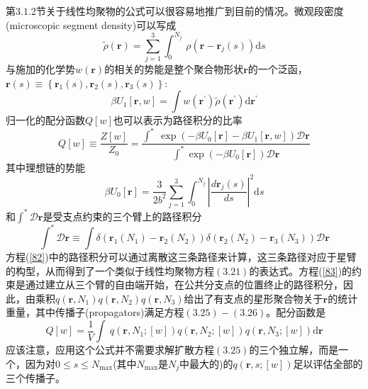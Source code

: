 第$3.1.2$节关于线性均聚物的公式可以很容易地推广到目前的情况。微观段密度(microscopic segment density)可以写成
\begin{equation}
\tilde{\rho}(\mathbf{r})=\sum_{j=1}^3 \int_{0}^{N_j}\,\rho(\mathbf{r}-\mathbf{r}_{j}(s)) \mathrm{d}s
\end{equation}
与施加的化学势$w (\mathbf{r})$的相关的势能是整个聚合物形状$\mathbf{r}$的一个泛函，$\mathbf{r}(s)\equiv \left\{ \mathbf{r}_1(s),\mathbf{r}_2(s),\mathbf{r}_3(s) \right\}:$
\begin{equation}
\beta U_1[\mathbf{r},w]=\int w(\mathbf{r}^{'})\tilde{\rho}(\mathbf{r}^{'})\mathrm{d}\mathbf{r}^{'}
\end{equation}
归一化的配分函数$Q[w]$也可以表示为路径积分的比率
\begin{equation}
Q[w]\equiv \frac{Z[w]}{Z_0}=\frac{\int^{*}~\exp (-\beta U_0[\mathbf{r}]-\beta U_1[\mathbf{r},w])\mathcal{D}\mathbf{r}}{\int^{*} \exp (-\beta U_0[\mathbf{r}]) \mathcal{D}\mathbf{r}} \label{82}
\end{equation}
其中理想链的势能
\begin{equation}
\beta U_0[\mathbf{r}]=\frac{3}{2b^2}\sum_{j=1}^3\int_{0}^{N_j} \left| \frac{d\mathbf{r}_j(s)}{ds} \right|^2 \mathrm{d}s
\end{equation}
和$\int^{*}\mathcal{D}\mathbf{r}$是受支点约束的三个臂上的路径积分
\begin{equation}
\int^{*}\mathcal{D}\mathbf{r}\equiv \int \delta (\mathbf{r}_1(N_1)-\mathbf{r}_2(N_2))\delta (\mathbf{r}_2(N_2)-\mathbf{r}_3(N_3)) \mathcal{D}\mathbf{r}  \label{83}
\end{equation}
方程(\ref{82})中的路径积分可以通过离散这三条路径来计算，这三条路径对应于星臂的构型，从而得到了一个类似于线性均聚物方程$(3.21)$的表达式。方程(\ref{83})的约束是通过建立从三个臂的自由端开始，在公共分支点的位置终止的路径积分，因此，由乘积$q(\mathbf{r},N_1)q(\mathbf{r},N_2)q(\mathbf{r},N_3)$给出了有支点的星形聚合物关于$\mathbf{r}$的统计重量，其中传播子(propagators)满足方程$(3.25)-(3.26)$。配分函数是
\begin{equation}
Q[w]=\frac{1}{V}\int ~q(\mathbf{r},N_1;[w])q(\mathbf{r},N_2;[w])q(\mathbf{r},N_3;[w]) \mathrm{d}\mathbf{r}
\end{equation}
应该注意，应用这个公式并不需要求解扩散方程$(3.25)$的三个独立解，而是一个，因为对$0\leq s\leq N_{\max}$(其中$N_{\max}$是$N_j$中最大的)的$q(\mathbf{r},s;[w])$足以评估全部的三个传播子。

